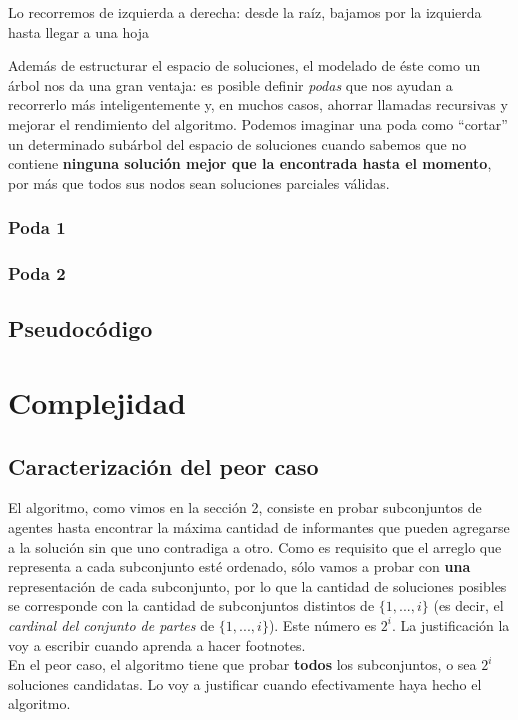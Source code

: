 \documentclass[10pt, a4paper]{article}
\begin{document}
		Lo recorremos de izquierda a derecha: desde la ra\'iz, bajamos por la izquierda hasta llegar a una hoja
		
		Adem\'as de estructurar el espacio de soluciones, el modelado de \'este como un \'arbol nos da una gran ventaja: es posible definir \textit{podas} que nos ayudan a recorrerlo m\'as inteligentemente y, en muchos casos, ahorrar llamadas recursivas y mejorar el rendimiento del algoritmo. Podemos imaginar una poda como ``cortar'' un determinado sub\'arbol del espacio de soluciones cuando sabemos que no contiene \textbf{ninguna soluci\'on mejor que la encontrada hasta el momento}, por m\'as que todos sus nodos sean soluciones parciales v\'alidas.
	
	\subsubsection{Poda 1}
	
	\subsubsection{Poda 2}
	
	\subsection{Pseudoc\'odigo}

\section{Complejidad}

	\subsection{Caracterizaci\'on del peor caso}
	El algoritmo, como vimos en la secci\'on 2, consiste en probar subconjuntos de agentes hasta encontrar la m\'axima cantidad de informantes que pueden agregarse a la soluci\'on sin que uno contradiga a otro. Como es requisito que el arreglo que representa a cada subconjunto est\'e ordenado, s\'olo vamos a probar con \textbf{una} representaci\'on de cada subconjunto, por lo que la cantidad de soluciones posibles se corresponde con la cantidad de subconjuntos distintos de $\{1,...,i\}$ (es decir, el \textit{cardinal del conjunto de partes} de $\{1,...,i\}$). Este n\'umero es $2^{i}$. La justificaci\'on la voy a escribir cuando aprenda a hacer footnotes.
	\\
	En el peor caso, el algoritmo tiene que probar \textbf{todos} los subconjuntos, o sea $2^{i}$ soluciones candidatas. Lo voy a justificar cuando efectivamente haya hecho el algoritmo.
\end{document}
